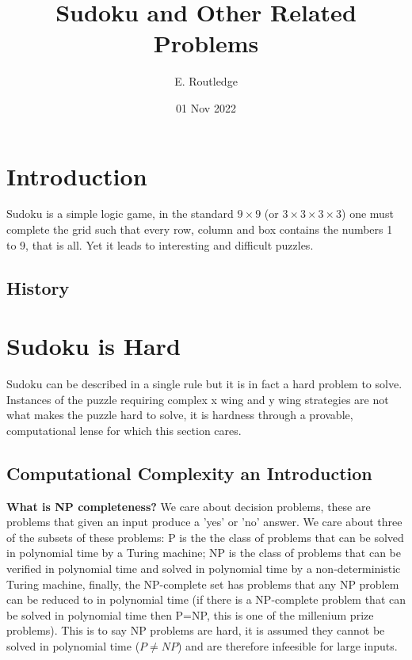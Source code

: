 \documentclass[a4paper,12pt]{article}
\author{E. Routledge}
\date{01 Nov 2022}
\title{Sudoku and Other Related Problems}
\begin{document}
\lstset{language=Python}
\maketitle

\section{Introduction}
		Sudoku is a simple logic game, in the standard $9 \times 9$ (or $3 \times 3 \times 3 \times 3$) 
		one must complete the grid such that every row, column and box contains the numbers 1 to 9, that is all. 
		Yet it leads to interesting and difficult puzzles.
	\subsection{History}
\section{Sudoku is Hard}

		Sudoku can be described in a single rule but it is in fact a hard problem to solve.
		Instances of the puzzle requiring complex x wing and y wing strategies are not what makes the puzzle hard to solve,
		it is hardness through a provable, computational lense for which this section cares. 
		
	\subsection{Computational Complexity an Introduction}
		\textbf{What is NP completeness?}
		We care about decision problems, these are problems that given an input  produce a 'yes' or 'no' answer. We care about three of the subsets of these problems: P is the the class of problems that can be solved in polynomial time by a Turing machine; NP is the class of problems that can be verified in polynomial time and solved in polynomial time by a non-deterministic Turing machine, finally, the NP-complete set has problems that any NP problem can be reduced to in polynomial time (if there is a NP-complete problem that can be solved in polynomial time then P=NP, this is one of the millenium prize problems).
		This is to say NP problems are hard, it is assumed they cannot be solved in polynomial time ($P \neq NP$) and are therefore infeesible for large inputs.
\end{document}
